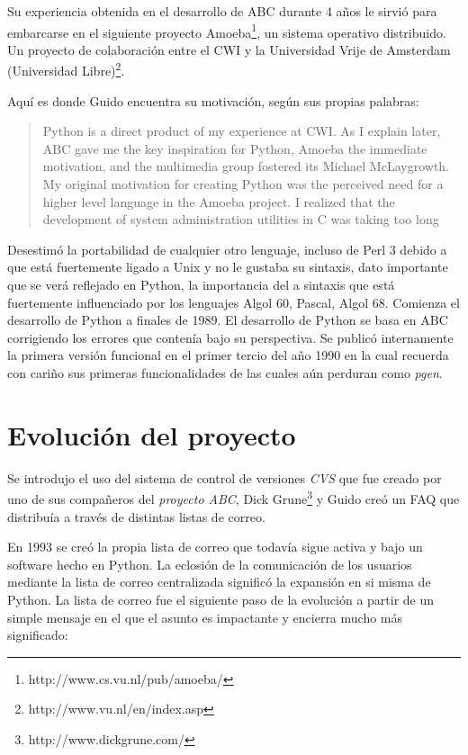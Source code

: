 \documentclass[11pt]{scrartcl}
\begin{document}
Su experiencia obtenida en el desarrollo de ABC durante 4 años le sirvió para embarcarse en el siguiente proyecto Amoeba\footnote{http://www.cs.vu.nl/pub/amoeba/}, un sistema operativo distribuido. Un proyecto de colaboración entre el CWI y la Universidad Vrije de Amsterdam (Universidad Libre)\footnote{http://www.vu.nl/en/index.asp}.

Aquí es donde Guido encuentra su motivación, según sus propias palabras:
\begin{quotation}
    Python is a direct product of my experience at CWI. As I explain later, ABC gave me the key inspiration for Python, Amoeba the immediate motivation, and the multimedia group fostered its Michael McLaygrowth.\\

    My original motivation for creating Python was the perceived need for a higher level language in the Amoeba project. I realized that the development of system administration utilities in C was taking too long
\end{quotation}

Desestimó la portabilidad de cualquier otro lenguaje, incluso de Perl 3 debido a que está fuertemente ligado a Unix y no le gustaba su sintaxis, dato importante que se verá reflejado en Python, la importancia del a sintaxis que está fuertemente influenciado por los lenguajes Algol 60, Pascal, Algol 68.
Comienza el desarrollo de Python a finales de 1989. El desarrollo de Python se basa en ABC corrigiendo los errores que contenía bajo su perspectiva. Se publicó internamente la primera versión funcional en el primer tercio del año 1990 en la cual recuerda con cariño sus primeras funcionalidades de las cuales aún perduran como \emph{pgen}.

\section{Evolución del proyecto}\label{sec:projectevolution}

Se introdujo el uso del sistema de control de versiones \emph{CVS} que fue creado por uno de sus compañeros del \emph{proyecto ABC}, Dick Grune\footnote{http://www.dickgrune.com/} y Guido creó un FAQ que distribuía a través de distintas listas de correo.

En 1993 se creó la propia lista de correo que todavía sigue activa y bajo un software hecho en Python. La eclosión de la comunicación de los usuarios mediante la lista de correo centralizada significó la expansión en si misma de Python. La lista de correo fue el siguiente paso de la evolución a partir de un simple mensaje en el que el asunto es impactante y encierra mucho más significado:
\end{document}
